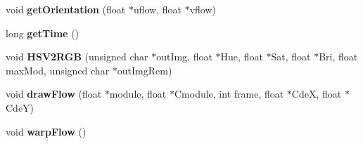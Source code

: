 \begin{DoxyCompactItemize}
\item 
void {\bfseries get\+Orientation} (float $\ast$uflow, float $\ast$vflow)\label{classoFlow_abc7353d84eb0037459b77ab5e4c1bac5}

\item 
long {\bfseries get\+Time} ()\label{classoFlow_ae7658f14751f53e07786fc7165a52b9c}

\item 
void {\bfseries H\+S\+V2\+R\+G\+B} (unsigned char $\ast$out\+Img, float $\ast$Hue, float $\ast$Sat, float $\ast$Bri, float max\+Mod, unsigned char $\ast$out\+Img\+Rem)\label{classoFlow_ae41b13f26705e31d21a147807f318af4}

\item 
void {\bfseries draw\+Flow} (float $\ast$module, float $\ast$Cmodule, int frame, float $\ast$Cde\+X, float $\ast$Cde\+Y)\label{classoFlow_ac1a5b68ccb4455f3397bf19be55d34ec}

\item 
void {\bfseries warp\+Flow} ()\label{classoFlow_a4fb019ad9c395104597267527513f30a}

\end{DoxyCompactItemize}
